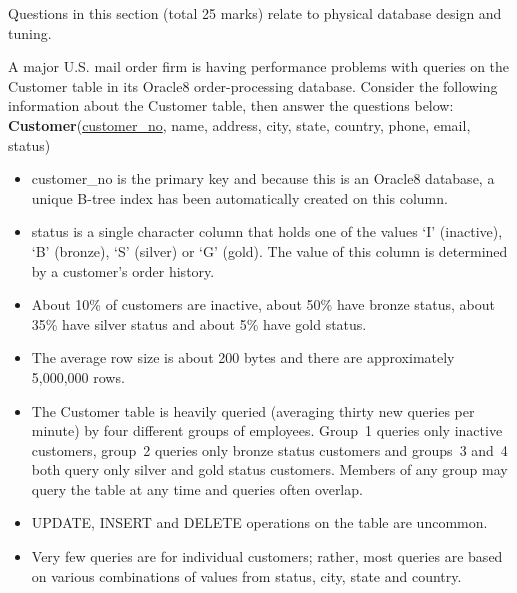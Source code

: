 \begin{examsection}{25}{}{Questions in this section (total 25 marks) relate to
physical database design and tuning.}


\begin{question}{10}

	A major U.S. mail order firm is having performance problems with queries on
	the \textsf{Customer} table in its Oracle8 order-processing database.
	Consider the following information about the \textsf{Customer} table, then
	answer the questions below:	\\

	\textsf{\textbf{Customer}(\underline{customer\_no}, name, address, city,
	state, country, phone, email, status)}

	\begin{itemize}

		\item \textsf{customer\_no} is the primary key and because this is an
		Oracle8 database, a unique B-tree index has been automatically created
		on this column.

		\item \textsf{status} is a single character column that holds one of
		the values `I' (inactive), `B' (bronze), `S' (silver) or `G' (gold).
		The value of this column is determined by a customer's order history.

		\item About 10\% of customers are inactive, about 50\% have bronze
		status, about 35\% have silver status and about 5\% have gold status.

		\item The average row size is about 200 bytes and there are
		approximately 5,000,000 rows.

		\item The \textsf{Customer} table is heavily queried (averaging thirty
		new queries per minute) by four different groups of employees. Group~1
		queries only inactive customers, group~2 queries only bronze status
		customers and groups~3 and~4 both query only silver and gold status
		customers. Members of any group may query the table at any time and
		queries often overlap.

		\item UPDATE, INSERT and DELETE operations on the table are uncommon.

		\item Very few queries are for individual customers; rather, most
		queries are based on various combinations of values from
		\textsf{status}, \textsf{city}, \textsf{state} and \textsf{country}.


\end{itemize}
\end{question}
\end{examsection}
